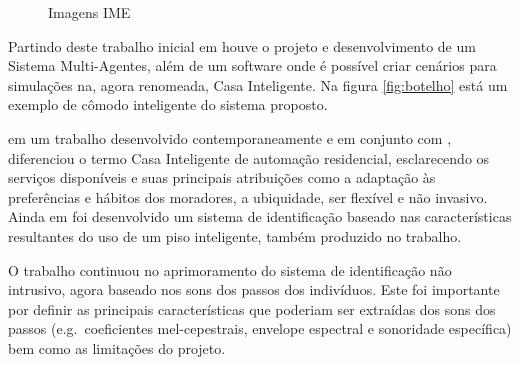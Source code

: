 \begin{figure}[ht]
\centering
{}
\caption{Imagens IME}
\end{figure}

Partindo deste trabalho inicial em \cite{Botelho2005} houve o projeto e desenvolvimento de um Sistema Multi-Agentes, além de um software onde é possível criar cenários para simulações na, agora renomeada, Casa Inteligente. %
Na figura \ref{fig:botelho} está um exemplo de cômodo inteligente do sistema proposto.


\cite{Lima2005} em um trabalho desenvolvido contemporaneamente e em conjunto com \cite{Botelho2005}, diferenciou o termo Casa Inteligente de automação residencial, esclarecendo os serviços disponíveis e suas principais atribuições como a adaptação às preferências e hábitos dos moradores, a ubiquidade, ser flexível e não invasivo. Ainda em \cite{Lima2005} foi desenvolvido um sistema de identificação baseado nas características resultantes do uso de um piso inteligente, também produzido no trabalho. %


O trabalho \cite{Carvalho2008} continuou no aprimoramento do sistema de identificação não intrusivo, agora baseado nos sons dos passos dos indivíduos. Este foi importante por definir as principais características que poderiam ser extraídas dos sons dos passos (e.g.\ coeficientes mel-cepestrais, envelope espectral e sonoridade específica) bem como as limitações do projeto. %

